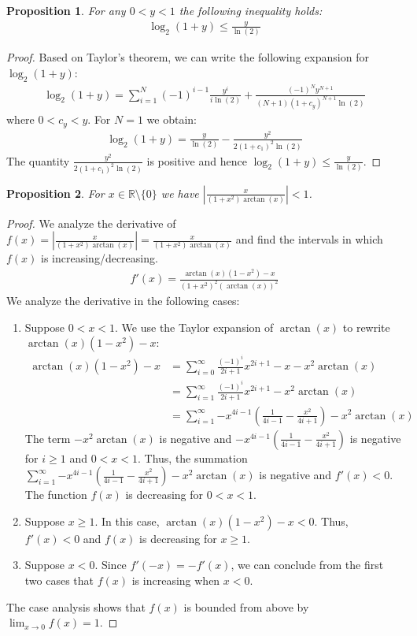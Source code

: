 \documentclass{article}
\newcommand{\real}{\mathbb{R}}
\numberwithin{mytheorem}{section}
\newtheorem{proposition}{Proposition}
\newcommand{\taylorarctan}[3] {\sum_{i=#1}^{#2}\frac{(-1)^i}{2i+1                                                                                                                                                                                                                                                                                                                                                                                                                                                                       }{#3}^{2i+1}}
\begin{document}
\begin{proposition}\label{prop:ln_bounds}
For any $0<y<1$ the following inequality holds:
\begin{align}
\log_2(1+y)\leq \frac{y}{\ln(2)}
\end{align}
\end{proposition}

\begin{proof}
Based on Taylor's theorem, we can write the following expansion for $\log_2(1+y)$:
\begin{align*}
\log_2(1+y)=\sum_{i=1}^{N}(-1)^{i-1}\frac{y^i}{i\ln(2)}+\frac{(-1)^Ny^{N+1}}{(N+1)(1+c_y)^{N+1}\ln(2)}
\end{align*}
where $0<c_y<y$. For $N=1$ we obtain:
\begin{align*}
\log_2(1+y)=\frac{y}{\ln(2)}-\frac{y^2}{2(1+c_1)^2\ln(2)}
\end{align*}
The quantity $\frac{y^2}{2(1+c_1)^2\ln(2)}$ is positive and hence $\log_2(1+y)\leq \frac{y}{\ln(2)}$. 

\end{proof}




\begin{proposition}\label{prop:arctan_condition}
For $x\in \real\setminus\{0\}$ we have $|\frac{x}{(1+x^2)\arctan(x)}|<1$.  
\end{proposition}

\begin{proof}
We analyze the derivative of $f(x)=|\frac{x}{(1+x^2)\arctan(x)}|=\frac{x}{(1+x^2)\arctan(x)}$ and find the intervals in which $f(x)$ is increasing/decreasing. 
\begin{align*}
f'(x)=\frac{\arctan(x)(1-x^2)-x}{(1+x^2)^2(\arctan (x))^2}
\end{align*}
We analyze the derivative in the following cases:
\begin{enumerate}
\item
Suppose $0<x<1$. We use the Taylor expansion of $\arctan(x)$ to rewrite $\arctan(x)(1-x^2)-x$:
\begin{align*}
\arctan(x)(1-x^2)-x&=\taylorarctan{0}{\infty}{x}-x-x^2\arctan(x)\\
&=\taylorarctan{1}{\infty}{x}-x^2\arctan(x)\\
&=\sum_{i=1}^{\infty}{-x^{4i-1}(\frac{1}{4i-1}-\frac{x^2}{4i+1})}-x^2\arctan(x)
\end{align*}
The term $-x^2\arctan(x)$ is negative and $-x^{4i-1}(\frac{1}{4i-1}-\frac{x^2}{4i+1})$ is negative for $i\geq 1$ and $0<x<1$. Thus, the summation $\sum_{i=1}^{\infty}{-x^{4i-1}(\frac{1}{4i-1}-\frac{x^2}{4i+1})}-x^2\arctan(x)$ is negative and $f'(x)<0$. The function $f(x)$ is decreasing for $0<x<1$.
\item
Suppose $x\geq 1$. In this case, $\arctan(x)(1-x^2)-x<0$. Thus, $f'(x)<0$ and $f(x)$ is decreasing for $x\geq 1$.
\item
Suppose $x<0$. Since $f'(-x)=-f'(x)$, we can conclude from the first two cases that $f(x)$ is increasing when $x<0$.
\end{enumerate}
The case analysis shows that $f(x)$ is bounded from above by $\lim_{x\to 0}f(x)=1$.

\end{proof}
\end{document}
